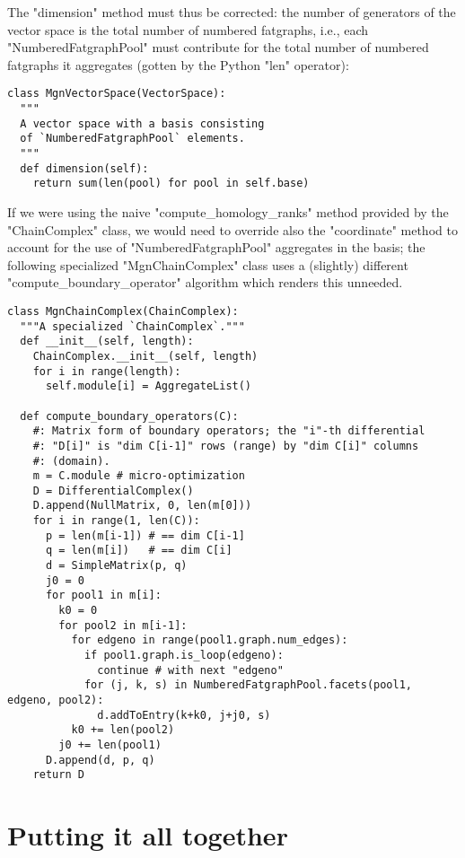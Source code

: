 The "dimension" method must thus be corrected: the number of
generators of the vector space is the total number of numbered
fatgraphs, i.e., each "NumberedFatgraphPool" must contribute for the
total number of numbered fatgraphs it aggregates (gotten by the Python
"len" operator):
\begin{lstlisting}
class MgnVectorSpace(VectorSpace):
  """
  A vector space with a basis consisting
  of `NumberedFatgraphPool` elements.
  """
  def dimension(self):
    return sum(len(pool) for pool in self.base)

\end{lstlisting}
If we were using the naive "compute_homology_ranks" method provided by
the "ChainComplex" class, we would need to override also the
"coordinate" method to account for the use of "NumberedFatgraphPool"
aggregates in the basis; the following specialized "MgnChainComplex"
class uses a (slightly) different "compute_boundary_operator"
algorithm which renders this unneeded.

\begin{lstlisting}
class MgnChainComplex(ChainComplex):
  """A specialized `ChainComplex`."""
  def __init__(self, length):
    ChainComplex.__init__(self, length)
    for i in range(length):
      self.module[i] = AggregateList()

  def compute_boundary_operators(C):
    #: Matrix form of boundary operators; the "i"-th differential
    #: "D[i]" is "dim C[i-1]" rows (range) by "dim C[i]" columns
    #: (domain).
    m = C.module # micro-optimization
    D = DifferentialComplex()
    D.append(NullMatrix, 0, len(m[0]))
    for i in range(1, len(C)):
      p = len(m[i-1]) # == dim C[i-1]
      q = len(m[i])   # == dim C[i]
      d = SimpleMatrix(p, q)
      j0 = 0
      for pool1 in m[i]:
        k0 = 0
        for pool2 in m[i-1]:
          for edgeno in range(pool1.graph.num_edges):
            if pool1.graph.is_loop(edgeno):
              continue # with next "edgeno"
            for (j, k, s) in NumberedFatgraphPool.facets(pool1, edgeno, pool2):
              d.addToEntry(k+k0, j+j0, s)
          k0 += len(pool2)
        j0 += len(pool1)
      D.append(d, p, q)
    return D

\end{lstlisting}


\section{Putting it all together}
\label{sec:algorithm-finale}

